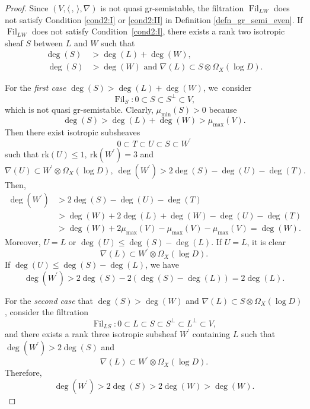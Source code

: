 \documentclass[11pt]{article}
\numberwithin{equation}{section}
\newcommand{\grsemistable}{gr\nobreakdash-semi\-stable\xspace}
\DeclareMathOperator{\Filt}{Fil}
\newcommand{\rk}{\mathrm{rk}}
\theoremstyle{plain}
\theoremstyle{definition}
\begin{document}
\begin{proof}
Since $(V,\langle \,, \, \rangle,\nabla)$ is not quasi \grsemistable, the filtration $\Filt_{LW}$ does not satisfy Condition \eqref{cond2:I} or \eqref{cond2:II} in Definition \ref{defn_gr_semi_even}. If $\Filt_{LW}$ does not satisfy Condition~\eqref{cond2:I}, there exists a rank two isotropic sheaf $S$ between $L$ and $W$ such that
\begin{align*}
\deg(S)&>\deg(L)+\deg(W),
\\\
\tag*{or}
\deg(S)&>\deg(W) \text{ and } \nabla(L)\subset S\otimes\Omega_X(\log D).
\end{align*}

For the \emph{first case} $\deg(S)>\deg(L)+\deg(W)$, we~consider
\[
\Filt_S:0\subset S\subset S^\perp\subset V,
\]
which is not quasi \grsemistable. Clearly, $\mu_{\min}(S)>0 $ because
\[
\deg(S)>\deg(L)+\deg(W)>\mu_{\max}(V).
\]
Then there exist isotropic subsheaves
\[
0\subset T\subset U\subset S\subset W^\prime 
\]
such that $\rk(U)\leq1,\ \rk(W^\prime)=3$ and
\[
\nabla(U )\subset W^\prime\otimes\Omega_X(\log D),\ \deg(W^\prime)>2\deg(S)-\deg(U)-\deg(T).
\]
Then,
\begin{equation*}
\begin{split}
\deg(W^\prime)&> 2\deg(S)-\deg(U)-\deg(T)\\
&>\deg(W)+2\deg(L)+\deg(W)-\deg(U)-\deg(T)\\
&>\deg(W)+2\mu_{\max}(V)-\mu_{\max}(V)-\mu_{\max}(V)=\deg(W).
\end{split}
\end{equation*}
Moreover, $U=L$ or $\deg(U)\leq \deg(S)-\deg(L)$. If $U=L$, it is clear
\[
\nabla(L)\subset W^\prime\otimes\Omega_X(\log D).
\]
If $\deg(U)\leq \deg(S)-\deg(L)$, we have
\[
\deg(W^\prime)>2\deg(S)-2(\deg(S)-\deg(L))=2\deg(L).
\]

For the \emph{second case} that $\deg(S)>\deg(W)$ and $\nabla(L)\subset S\otimes\Omega_X(\log D)$, consider the filtration
\[
\Filt_{LS}:0\subset L\subset S\subset S^\perp\subset L^\perp\subset V,
\]
and there exists a rank three isotropic subsheaf $W^\prime$ containing $L$ such that $\deg(W^\prime)>2\deg(S)$ and
\[
\nabla(L)\subset W^\prime\otimes\Omega_X(\log D).
\]
Therefore,
\[
\deg(W^\prime)>2\deg(S)>2\deg(W)>\deg(W).
\]


\end{proof}
\end{document}
